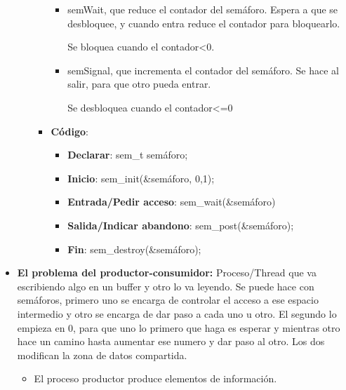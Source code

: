 \documentclass[12pt, twoside, openright]{report} %
\begin{document}
\begin{itemize}
\begin{itemize}
\begin{itemize}
\begin{itemize}
        \item semWait, que reduce el contador del semáforo. Espera a que se
          desbloquee, y cuando entra reduce el contador para bloquearlo.
          

          Se bloquea cuando el contador\textless0.
            
        \item semSignal, que incrementa el contador del semáforo. Se hace al
          salir, para que otro pueda entrar.
          

          
          Se desbloquea cuando el contador\textless=0
            
        \end{itemize}
      \item \textbf{Código}:
        

        \begin{itemize}
        \item \textbf{Declarar}: sem\_t semáforo;
          
        \item \textbf{Inicio}: sem\_init(\&semáforo, 0,1);
          
        \item \textbf{Entrada/Pedir acceso}: sem\_wait(\&semáforo)
          
        \item \textbf{Salida/Indicar abandono}: sem\_post(\&semáforo);
          
        \item \textbf{Fin}: sem\_destroy(\&semáforo);
          
        \end{itemize}
      \end{itemize}
    \end{itemize}
  \item \textbf{El problema del productor-consumidor:} Proceso/Thread que va
    escribiendo algo en un buffer y otro lo va leyendo. Se puede hace
    con semáforos, primero uno se encarga de controlar el acceso a ese
    espacio intermedio y otro se encarga de dar paso a cada uno u otro.
    El segundo lo empieza en 0, para que uno lo primero que haga es
    esperar y mientras otro hace un camino hasta aumentar ese numero y
    dar paso al otro. Los dos modifican la zona de datos compartida.
    

    \begin{itemize}
    \item El proceso productor produce elementos de información.
      

\end{itemize}
\end{itemize}
\end{document}

